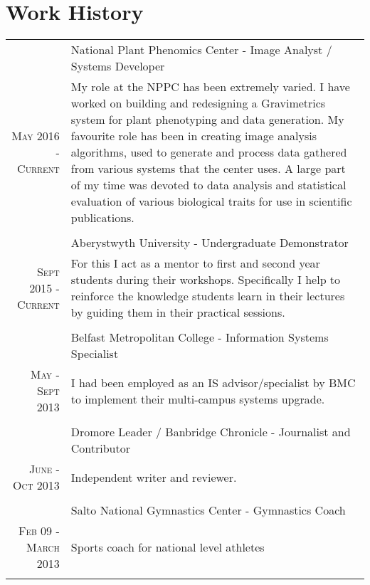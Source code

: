 \documentclass[a4paper,9pt]{article}
\begin{document}
\section{Work History}
\begin{longtable}{r|p{11cm}}
  
  &National Plant Phenomics Center - Image Analyst / Systems Developer \\\textsc{May 2016 - Current}
  &\footnotesize{
    My role at the NPPC has been extremely varied. I have worked on building and redesigning a Gravimetrics system for plant phenotyping and data generation. 
    My favourite role has been in creating image analysis algorithms, used to generate and process data gathered from various systems that the center uses.
    A large part of my time was devoted to data analysis and statistical evaluation of various biological traits for use in scientific publications.}\\\multicolumn{2}{c}{} \\
  
  
  &Aberystwyth University - Undergraduate Demonstrator \\ \textsc{Sept 2015 - Current}
  &\footnotesize{For this I act as a mentor to first and second year students during their workshops. Specifically I help to reinforce the knowledge students learn in their lectures by guiding them in their practical sessions.}\\\multicolumn{2}{c}{} \\

  &Belfast Metropolitan College - Information Systems Specialist \\\textsc{May - Sept 2013}
  &\footnotesize{I had been employed as an IS advisor/specialist by BMC to implement their multi-campus systems upgrade.}\\\multicolumn{2}{c}{} \\
  &Dromore Leader / Banbridge Chronicle - Journalist and Contributor \\\textsc{June - Oct 2013}
  &\footnotesize{Independent writer and reviewer.}\\\multicolumn{2}{c}{} \\

  &Salto National Gymnastics Center - Gymnastics Coach \\\textsc{Feb 09 - March 2013}
   & \footnotesize{Sports coach for national level athletes}\\\multicolumn{2}{c}{} \\
\end{longtable}
\end{document}
